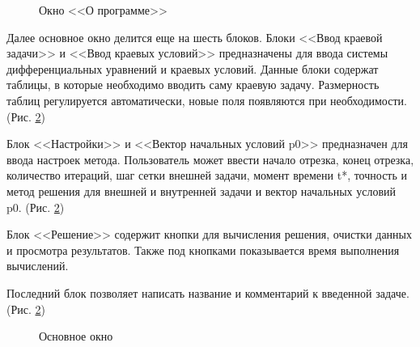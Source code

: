 \documentclass{article}
\begin{document}
\begin{figure}[!h]
\caption{Окно <<О программе>>}
\label{ris:about}
\end{figure}


Далее основное окно делится еще на шесть блоков.
Блоки <<Ввод краевой задачи>> и <<Ввод краевых условий>> предназначены для ввода системы дифференциальных уравнений и краевых условий. Данные блоки содержат таблицы, в которые необходимо вводить саму краевую задачу. Размерность таблиц регулируется автоматически, новые поля появляются при необходимости. (Рис. \ref{ris:main})

Блок <<Настройки>> и <<Вектор начальных условий p0>> предназначен для ввода настроек метода. Пользователь может ввести начало отрезка, конец отрезка, количество итераций, шаг сетки внешней задачи, момент времени t*, точность и метод решения для внешней и внутренней задачи и вектор начальных условий p0. (Рис. \ref{ris:main})

Блок <<Решение>> содержит кнопки для вычисления решения, очистки данных и просмотра результатов. Также под кнопками показывается время выполнения вычислений.

Последний блок позволяет написать название и комментарий к введенной задаче. (Рис. \ref{ris:main})

\begin{figure}[!h]
\caption{Основное окно}
\label{ris:main}
\end{figure}
\end{document}
